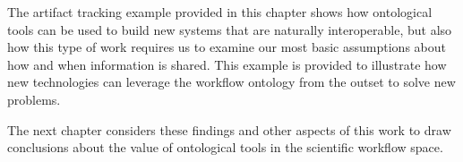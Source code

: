 The artifact tracking example provided in this chapter shows how ontological
tools can be used to build new systems that are naturally interoperable, but
also how this type of work requires us to examine our most basic assumptions
about how and when information is shared. This example is provided to illustrate
how new technologies can leverage the workflow ontology from the outset to
solve new problems. 


The next chapter considers these findings and other aspects of this work to
draw conclusions about the value of ontological tools in the scientific workflow
space.